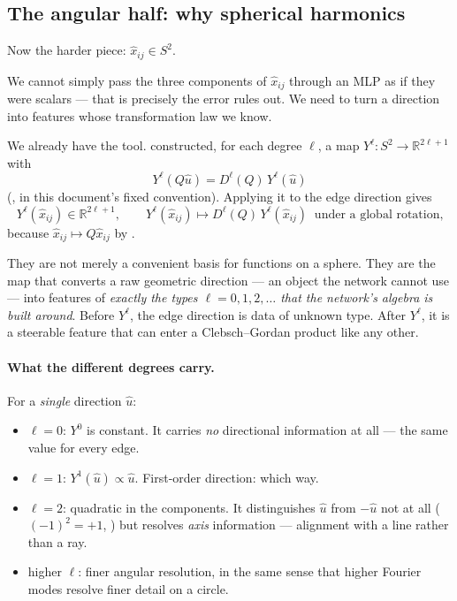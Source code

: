 \documentclass[11pt,a4paper]{report}
\theoremstyle{definition}
\theoremstyle{remark}
\newcommand{\RR}{\mathbb R}
\begin{document}
\subsection{The angular half: why spherical harmonics}
\label{sec:angular-features}

Now the harder piece: $\hat x_{ij}\in S^2$.

We cannot simply pass the three components of $\hat x_{ij}$ through an MLP
as if they were scalars --- that is precisely the error
 rules out. We need to turn a direction into
features whose transformation law we know.

We already have the tool. 
constructed, for each degree $\ell$, a map
$Y^\ell:S^2\to\RR^{2\ell+1}$ with
\[
Y^\ell(Q\hat u) = D^\ell(Q)\,Y^\ell(\hat u)
\]
(, in this document's fixed convention).
Applying it to the edge direction gives
\[
Y^\ell(\hat x_{ij})\in\RR^{2\ell+1},
\qquad
Y^\ell(\hat x_{ij}) \longmapsto D^\ell(Q)\,Y^\ell(\hat x_{ij})
\ \text{ under a global rotation,}
\]
because $\hat x_{ij}\mapsto Q\hat x_{ij}$ by
.

\begin{tcolorbox}[colback=green!3,colframe=green!35!black,title={The point of spherical harmonics, stated plainly}]
They are not merely a convenient basis for functions on a sphere. They are
the map that converts a raw geometric direction --- an object the network
cannot use --- into features of \emph{exactly the types
$\ell=0,1,2,\dots$ that the network's algebra is built around}. Before
$Y^\ell$, the edge direction is data of unknown type. After $Y^\ell$, it is
a steerable feature that can enter a Clebsch--Gordan product like any other.
\end{tcolorbox}

\paragraph{What the different degrees carry.} For a \emph{single} direction
$\hat u$:
\begin{itemize}[nosep]
\item $\ell=0$: $Y^0$ is constant. It carries \emph{no} directional
information at all --- the same value for every edge.
\item $\ell=1$: $Y^1(\hat u)\propto\hat u$. First-order direction: which way.
\item $\ell=2$: quadratic in the components. It distinguishes $\hat u$ from
$-\hat u$ not at all ($(-1)^2=+1$, ) but resolves
\emph{axis} information --- alignment with a line rather than a ray.
\item higher $\ell$: finer angular resolution, in the same sense that higher
Fourier modes resolve finer detail on a circle.
\end{itemize}
\end{document}
